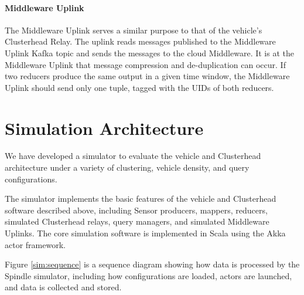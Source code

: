 \documentclass{thesis}
\begin{document}
    \paragraph{Middleware Uplink}
        The Middleware Uplink serves a similar purpose to that of the vehicle's Clusterhead Relay. The uplink
        reads messages published to the Middleware Uplink Kafka topic and sends the messages to the cloud Middleware.
        It is at the Middleware Uplink that message compression and de-duplication can occur. If two reducers produce
        the same output in a given time window, the Middleware Uplink should send only one tuple, tagged with the UIDs
        of both reducers. %



\section{Simulation Architecture}
    We have developed a simulator to evaluate the vehicle and Clusterhead architecture under a variety of clustering,
    vehicle density, and query configurations.

    The simulator implements the basic features of the vehicle and Clusterhead software described above, including
    Sensor producers, mappers, reducers, simulated Clusterhead relays, query managers, and simulated Middleware Uplinks.
    The core simulation software is implemented in Scala using the Akka actor framework.

    Figure \ref{sim:sequence} is a sequence diagram showing how data is processed by the Spindle simulator, including
    how configurations are loaded, actors are launched, and data is collected and stored.
\end{document}
